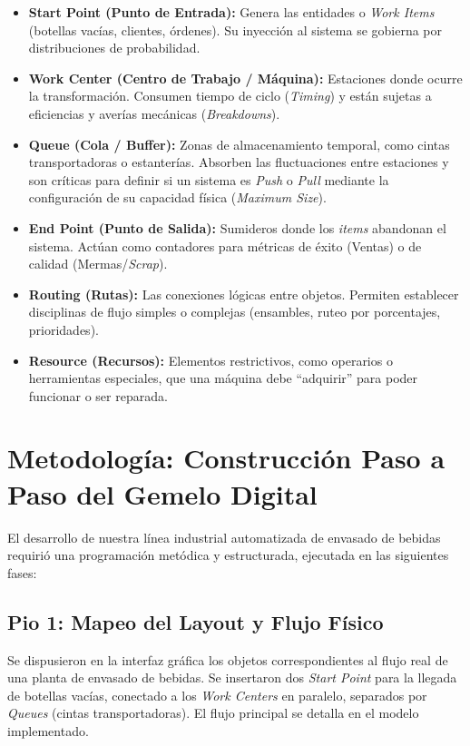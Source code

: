 \documentclass[12pt, a4paper]{article}
\begin{document}
\begin{itemize}
    \item \textbf{Start Point (Punto de Entrada):} Genera las entidades o \textit{Work Items} (botellas vacías, clientes, órdenes). Su inyección al sistema se gobierna por distribuciones de probabilidad.
    \item \textbf{Work Center (Centro de Trabajo / Máquina):} Estaciones donde ocurre la transformación. Consumen tiempo de ciclo (\textit{Timing}) y están sujetas a eficiencias y averías mecánicas (\textit{Breakdowns}).
    \item \textbf{Queue (Cola / Buffer):} Zonas de almacenamiento temporal, como cintas transportadoras o estanterías. Absorben las fluctuaciones entre estaciones y son críticas para definir si un sistema es \textit{Push} o \textit{Pull} mediante la configuración de su capacidad física (\textit{Maximum Size}).
    \item \textbf{End Point (Punto de Salida):} Sumideros donde los \textit{items} abandonan el sistema. Actúan como contadores para métricas de éxito (Ventas) o de calidad (Mermas/\textit{Scrap}).
    \item \textbf{Routing (Rutas):} Las conexiones lógicas entre objetos. Permiten establecer disciplinas de flujo simples o complejas (ensambles, ruteo por porcentajes, prioridades).
    \item \textbf{Resource (Recursos):} Elementos restrictivos, como operarios o herramientas especiales, que una máquina debe ``adquirir'' para poder funcionar o ser reparada.
\end{itemize}


\section{Metodología: Construcción Paso a Paso del Gemelo Digital}
El desarrollo de nuestra línea industrial automatizada de envasado de bebidas requirió una programación metódica y estructurada, ejecutada en las siguientes fases:

\subsection{Pio 1: Mapeo del Layout y Flujo Físico}
Se dispusieron en la interfaz gráfica los objetos correspondientes al flujo real de una planta de envasado de bebidas. Se insertaron dos \textit{Start Point} para la llegada de botellas vacías, conectado a los \textit{Work Centers} en paralelo, separados por \textit{Queues} (cintas transportadoras). El flujo principal se detalla en el modelo implementado.
\end{document}
